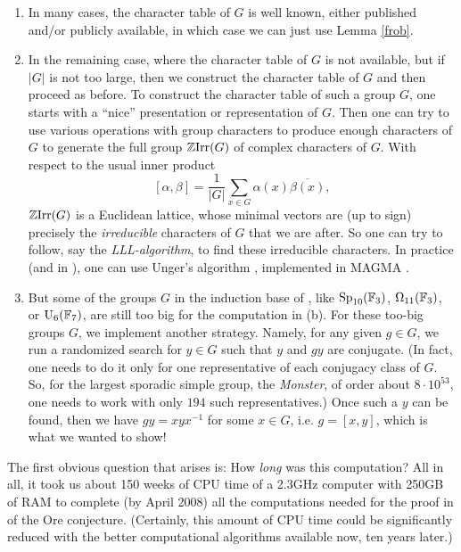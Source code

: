\begin{enumerate}[\rm(a)]
\item In many cases, the character table of $G$ is well known, either 
published and/or publicly available, in which case we can just use Lemma \ref{frob}. 

\item In the remaining case, where the character table of $G$ is not available, but if $|G|$ is not too large,
then we construct the character table of $G$ and then proceed as before. To construct the character table of
such a group $G$, one starts with a ``nice'' presentation or representation of $G$. Then one can try to use various operations with
group characters to produce enough characters of $G$ to generate the full group ${\mathbb Z}{\mathrm {Irr}}(G)$ of complex characters of 
$G$. With respect to the usual inner product
$$[\alpha,\beta] = \frac{1}{|G|}\sum_{x \in G}\alpha(x)\overline{\beta(x)},$$
${\mathbb Z}{\mathrm {Irr}}(G)$ is a Euclidean lattice, whose minimal vectors are (up to sign) precisely the {\it irreducible} characters of $G$ that we are after.  
So one can try to follow, say the {\it LLL-algorithm}, to find these irreducible characters. In practice (and in \cite{LBST}), one can use 
Unger's algorithm \cite{U}, implemented in {\sf MAGMA} \cite{Magma}.

\item But some of the groups $G$ in the induction base of \cite{LBST}, like ${\mathrm {Sp}}_{10}({\mathbb F}_3)$, $\Omega_{11}({\mathbb F}_3)$, or $\mathrm{U}_6({\mathbb F}_7)$, are still too big for the computation in (b). For these too-big groups $G$, we implement another 
strategy. Namely, for any given $g \in G$, we  run a randomized search for $y \in G$ such that $y$ and $gy$ are 
conjugate. (In fact, one needs to do it only for one representative of each conjugacy class of $G$. So, for the largest 
sporadic simple group, the {\it Monster}, of order about $8 \cdot 10^{53}$, one needs to work with only $194$ such representatives.)
Once such a $y$ can be found, then we have $gy = xyx^{-1}$ for some $x \in G$, i.e. $g = [x,y]$, which is what we wanted to show! 
\end{enumerate}

The first obvious question that arises is: How {\it long} was this computation? All in all, it took us about 150 weeks of CPU time of a 2.3GHz computer with 250GB of RAM to complete (by April 2008) all the computations needed for the proof in \cite{LBST} of the Ore conjecture. (Certainly, this amount of CPU time could be significantly reduced with the better computational algorithms available now, ten years later.)


